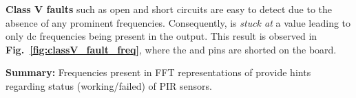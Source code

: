 \textbf{Class V faults} such as open and short circuits are %
easy to detect due to the absence of any prominent frequencies. Consequently, \aout is \textit{stuck at} a value leading to only dc frequencies being present in the output. This result is observed in {\bfseries Fig.~\ref{fig:classV_fault_freq}}, where the \cout and \aout pins are shorted on the board. 

\noindent \textbf{Summary:} %
Frequencies present in FFT representations of \aout provide hints regarding status (\ie working/failed) of PIR sensors.





